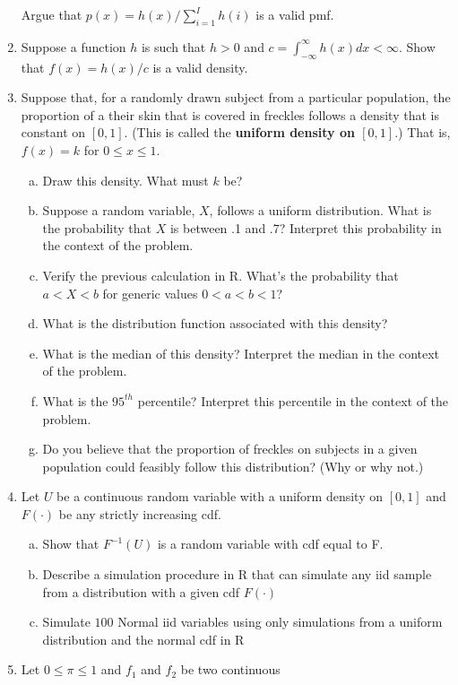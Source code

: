 \documentclass[12pt]{article}
\begin{document}
\begin{enumerate}[Problem 1.]
  Argue that $ p(x) = h(x) / \sum_{i=1}^I h(i) $ is a valid pmf.
\item  Suppose a function $h$ is such that $h>0$ and $c = \int_{-\infty}^\infty h(x) dx < \infty$.
  Show that $f(x) = h(x) / c$ is a valid density.
\item Suppose that, for a randomly drawn subject from a particular
  population, the proportion of a their skin that is covered in
  freckles follows a density that is constant on $[0,1]$. (This is
  called the {\bf uniform density on $[0,1]$}.) That is, $f(x) = k$ for $0\leq x
  \leq 1$.
  \begin{enumerate}[a.]
  \item Draw this density. What must $k$ be?
  \item Suppose a random variable, $X$, follows a uniform
    distribution. What is the probability that $X$ is between .1 and
    .7? Interpret
    this probability in the context of the problem.
  \item Verify the previous calculation in R. What's the probability that $a < X < b$ for
    generic values $0 < a < b < 1$?
  \item What is the distribution function associated with this density?
  \item What is the median of this density? Interpret the median in the context of the problem.
  \item What is the $95^{th}$ percentile? Interpret this percentile in the context of the problem.
  \item Do you believe that the proportion of freckles on subjects in a
    given population could feasibly follow this distribution? (Why or
    why not.)
  \end{enumerate}
\item Let $U$ be a continuous random variable with a uniform density on
$[0,1]$ and $F(\cdot)$ be any strictly increasing cdf.
  \begin{enumerate}[a.]
  \item Show that $F^{-1}(U)$ is a random variable with cdf equal to
  F.
  \item Describe a simulation procedure in R that can simulate any
  iid sample from a distribution with a given cdf $F(\cdot)$
  \item Simulate $100$ Normal iid variables using only simulations from
  a uniform distribution and the normal cdf in R
  \end{enumerate}
\item Let $0 \leq \pi \leq 1$ and $f_1$ and $f_2$ be two continuous

\end{enumerate}
\end{document}

